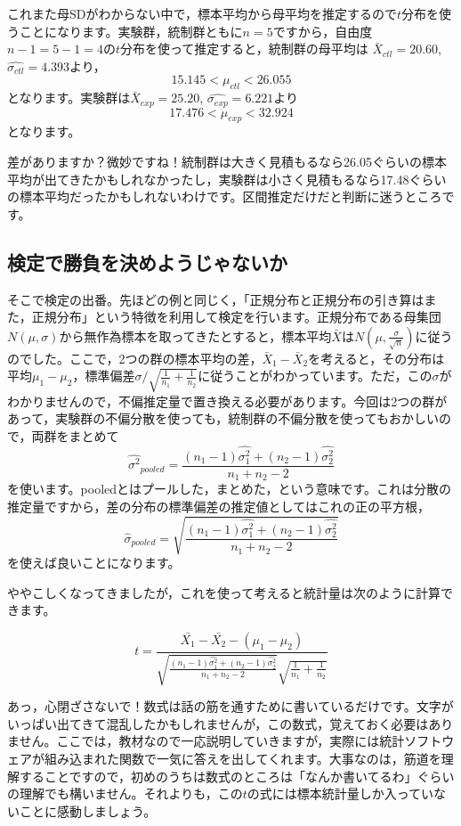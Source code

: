 \documentclass{ltjsarticle}
\begin{document}
これまた母SDがわからない中で，標本平均から母平均を推定するので$t$分布を使うことになります。実験群，統制群ともに$n=5$ですから，自由度$n-1=5-1=4$の$t$分布を使って推定すると，統制群の母平均は
$\bar{X}_{ctl} =20.60$,$\hat{\sigma_{ctl}}=4.393$より，
\[15.145 < \mu_{ctl}<26.055 \]
となります。実験群は$\bar{X}_{exp} = 25.20$,
$\hat{\sigma_{exp}}=6.221$より
\[17.476<\mu_{exp}< 32.924 \]
となります。

差がありますか？微妙ですね！統制群は大きく見積もるなら26.05ぐらいの標本平均が出てきたかもしれなかったし，実験群は小さく見積もるなら17.48ぐらいの標本平均だったかもしれないわけです。区間推定だけだと判断に迷うところです。
\subsection{検定で勝負を決めようじゃないか}
そこで検定の出番。先ほどの例と同じく，「正規分布と正規分布の引き算はまた，正規分布」という特徴を利用して検定を行います。正規分布である母集団$N(\mu,\sigma)$から無作為標本を取ってきたとすると，標本平均$\bar{X}$は$N(\mu,\frac{\sigma}{\sqrt{n}})$に従うのでした。ここで，2つの群の標本平均の差，$\bar{X}_1 - \bar{X}_2$を考えると，その分布は平均$\mu_1-\mu_2$，標準偏差$\sigma/\sqrt{\frac{1}{n_1}+\frac{1}{n_2}}$に従うことがわかっています。ただ，この$\sigma$がわかりませんので，不偏推定量で置き換える必要があります。今回は2つの群があって，実験群の不偏分散を使っても，統制群の不偏分散を使ってもおかしいので，両群をまとめて
\[ \hat{\sigma^2}_{pooled} = \frac{(n_1-1)\hat{\sigma_1^2}+(n_2-1)\hat{\sigma_2^2}}{n_1+n_2 - 2}\]
を使います。pooledとはプールした，まとめた，という意味です。これは分散の推定量ですから，差の分布の標準偏差の推定値としてはこれの正の平方根，
\[ \hat{\sigma}_{pooled} = \sqrt{\frac{(n_1-1)\hat{\sigma_1^2}+(n_2-1)\hat{\sigma_2^2}}{n_1+n_2 - 2}}\]を使えば良いことになります。

ややこしくなってきましたが，これを使って考えると統計量は次のように計算できます。

\[ t = \frac{\bar{X_1}-\bar{X_2}-(\mu_1-\mu_2)}{\sqrt{\frac{(n_1-1)\hat{\sigma_1^2}+(n_2-1)\hat{\sigma_2^2}}{n_1+n_2 - 2}}\sqrt{\frac{1}{n_1}+\frac{1}{n_2}}}\]

あっ，心閉ざさないで！数式は話の筋を通すために書いているだけです。文字がいっぱい出てきて混乱したかもしれませんが，この数式，覚えておく必要はありません。ここでは，教材なので一応説明していきますが，実際には統計ソフトウェアが組み込まれた関数で一気に答えを出してくれます。大事なのは，筋道を理解することですので，初めのうちは数式のところは「なんか書いてるわ」ぐらいの理解でも構いません。それよりも，この$t$の式には標本統計量しか入っていないことに感動しましょう。
\end{document}
